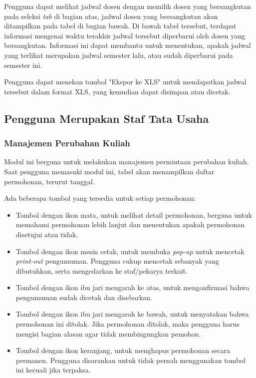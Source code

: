 Pengguna dapat melihat jadwal dosen dengan memilih dosen yang bersangkutan pada seleksi \textit{tab} di bagian atas, jadwal dosen yang bersangkutan akan ditampilkan pada tabel di bagian bawah. Di bawah tabel tersebut, terdapat informasi mengenai waktu terakhir jadwal tersebut diperbarui oleh dosen yang bersangkutan. Informasi ini dapat membantu untuk menentukan, apakah jadwal yang terlihat merupakan jadwal semester lalu, atau sudah diperbarui pada semester ini.

Pengguna dapat menekan tombol "Ekspor ke XLS" untuk mendapatkan jadwal tersebut dalam format XLS, yang kemudian dapat disimpan atau dicetak.

\subsection{Pengguna Merupakan Staf Tata Usaha}
\label{sec:bluetape_staf_tata_usaha}

\subsubsection{Manajemen Perubahan Kuliah}
\label{sec:bluetape_manajemen_perubahan_kuliah}
Modul ini berguna untuk melakukan manajemen permintaan perubahan kuliah. Saat pengguna memasuki modul ini, tabel akan menampilkan daftar permohonan, terurut tanggal.

Ada beberapa tombol yang tersedia untuk setiap permohonan:
\begin{itemize}
	\item Tombol dengan ikon mata, untuk melihat detail permohonan, berguna untuk memahami permohonan lebih lanjut dan menentukan apakah permohonan disetujui atau tidak.
	\item Tombol dengan ikon mesin cetak, untuk membuka \textit{pop-up} untuk mencetak \textit{print-out} pengumuman. Pengguna cukup mencetak sebanyak yang dibutuhkan, serta mengedarkan ke staf/pekarya terkait.
	\item Tombol dengan ikon ibu jari mengarah ke atas, untuk mengonfirmasi bahwa pengumuman sudah dicetak dan disebarkan.
	\item Tombol dengan ikon ibu jari mengarah ke bawah, untuk menyatakan bahwa permohonan ini ditolak. Jika permohonan ditolak, maka pengguna harus mengisi bagian alasan agar tidak membingungkan pemohon.
	\item Tombol dengan ikon keranjang, untuk menghapus permohonan secara permanen. Pengguna disarankan untuk tidak pernah menggunakan tombol ini kecuali jika terpaksa.
\end{itemize}

